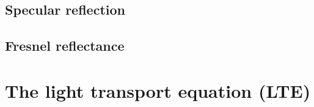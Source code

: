 \subsection{Specular reflection}

\subsection{Fresnel reflectance}

\section{The light transport equation (LTE)}

